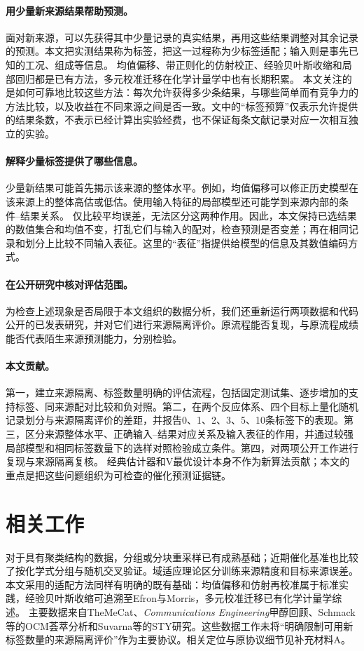 \documentclass[11pt,a4paper]{article}
\begin{document}
\paragraph{用少量新来源结果帮助预测。}
面对新来源，可以先获得其中少量记录的真实结果，再用这些结果调整对其余记录的预测。本文把实测结果称为标签，把这一过程称为少标签适配；输入则是事先已知的工况、组成等信息。
均值偏移、带正则化的仿射校正、经验贝叶斯收缩\cite{efron}和局部回归都是已有方法，多元校准迁移在化学计量学中也有长期积累\cite{feudale}。
本文关注的是如何可靠地比较这些方法：每次允许获得多少条结果，与哪些简单而有竞争力的方法比较，以及收益在不同来源之间是否一致。文中的“标签预算”仅表示允许提供的结果条数，不表示已经计算出实验经费，也不保证每条文献记录对应一次相互独立的实验。

\paragraph{解释少量标签提供了哪些信息。}
少量新结果可能首先揭示该来源的整体水平。例如，均值偏移可以修正历史模型在该来源上的整体高估或低估。使用输入特征的局部模型还可能学到来源内部的条件--结果关系。
仅比较平均误差，无法区分这两种作用。因此，本文保持已选结果的数值集合和均值不变，打乱它们与输入的配对，检查预测是否变差；再在相同记录和划分上比较不同输入表征。这里的“表征”指提供给模型的信息及其数值编码方式。

\paragraph{在公开研究中核对评估范围。}
为检查上述现象是否局限于本文组织的数据分析，我们还重新运行两项数据和代码公开的已发表研究，并对它们进行来源隔离评价。原流程能否复现，与原流程成绩能否代表陌生来源预测能力，分别检验。

\paragraph{本文贡献。}
第一，建立来源隔离、标签数量明确的评估流程，包括固定测试集、逐步增加的支持标签、同来源配对比较和负对照。第二，在两个反应体系、四个目标上量化随机记录划分与来源隔离评价的差距，并报告0、1、2、3、5、10条标签下的表现。第三，区分来源整体水平、正确输入--结果对应关系及输入表征的作用，并通过较强局部模型和相同标签数量下的选样对照检验成立条件。第四，对两项公开工作进行复现与来源隔离复核。
经典估计器和V最优设计本身不作为新算法贡献；本文的重点是把这些问题组织为可检查的催化预测证据链。

\section{相关工作}
对于具有聚类结构的数据，分组或分块重采样已有成熟基础\cite{roberts}；近期催化基准也比较了按化学式分组与随机交叉验证\cite{wu}。域适应理论区分训练来源精度和目标来源误差\cite{bendavid}。
本文采用的适配方法同样有明确的既有基础：均值偏移和仿射再校准属于标准实践\cite{steyerberg2019}，经验贝叶斯收缩可追溯至Efron与Morris\cite{efron}，多元校准迁移已有化学计量学综述\cite{feudale}。
主要数据来自TheMeCat\cite{toldy}、\emph{Communications Engineering}甲醇回顾\cite{yan}、Schmack等的OCM荟萃分析\cite{schmack}和Suvarna等的STY研究\cite{suvarna}。这些数据工作未将“明确限制可用新标签数量的来源隔离评价”作为主要协议。相关定位与原协议细节见补充材料A。
\end{document}
